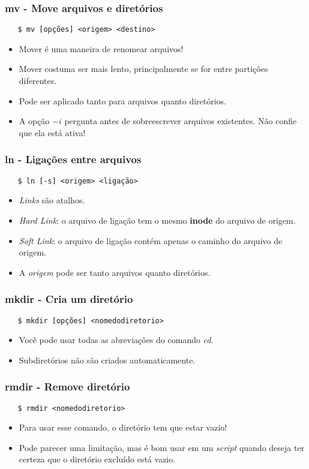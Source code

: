 \documentclass{beamer}
\begin{document}
\begin{frame}[fragile]
   \frametitle{mv - Move arquivos e diretórios}
   \begin{verbatim}
   $ mv [opções] <origem> <destino> 
   \end{verbatim}
   \begin{itemize}
      \item Mover é uma maneira de renomear arquivos!
      \item Mover costuma ser mais lento, principalmente se for entre partições diferentes.
      \item Pode ser aplicado tanto para arquivos quanto diretórios.
      \item A opção $-i$ pergunta antes de sobreescrever arquivos existentes. Não confie que ela está ativa!
   \end{itemize}
\end{frame}

\begin{frame}[fragile]
   \frametitle{ln - Ligações entre arquivos}
   \begin{verbatim}
   $ ln [-s] <origem> <ligação>
   \end{verbatim}
   \begin{itemize}
      \item \textit{Links} são atalhos.
      \item \textit{Hard Link}: o arquivo de ligação tem o mesmo \textbf{inode} do arquivo de origem.
      \item \textit{Soft Link}: o arquivo de ligação contém apenas o caminho do arquivo de origem.
      \item A \textit{origem} pode ser tanto arquivos quanto diretórios.
   \end{itemize}
\end{frame}

\begin{frame}[fragile]
   \frametitle{mkdir - Cria um diretório}
   \begin{verbatim}
   $ mkdir [opções] <nomedodiretorio>
   \end{verbatim}
   \begin{itemize}
      \item Você pode usar todas as abreviações do comando \textit{cd}.
      \item Subdiretórios não são criados automaticamente.
   \end{itemize}
\end{frame}

\begin{frame}[fragile]
   \frametitle{rmdir - Remove diretório}
   \begin{verbatim}
   $ rmdir <nomedodiretorio>
   \end{verbatim}
   \begin{itemize}
      \item Para usar esse comando, o diretório tem que estar vazio!
      \item Pode parecer uma limitação, mas é bom usar em um \textit{script} quando deseja ter certeza que o diretório excluído está vazio.
   \end{itemize}
\end{frame}
\end{document}
